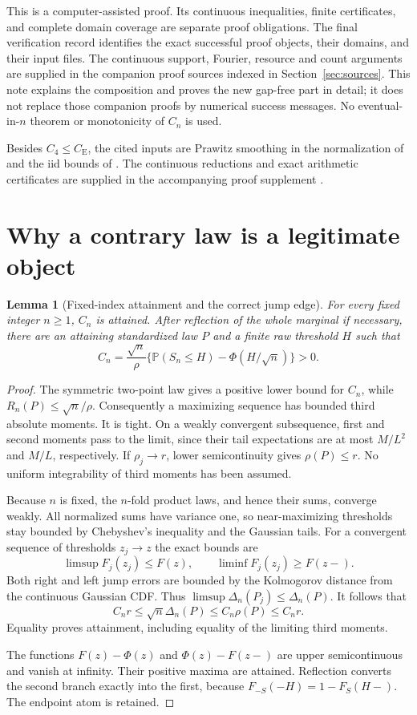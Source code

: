\documentclass[11pt,a4paper]{article}
\newtheorem{lemma}[theorem]{Lemma}
\theoremstyle{definition}
\newcommand{\Pp}{\mathbb P}
\newcommand{\CE}{C_{\mathrm E}}
\begin{document}
This is a computer-assisted proof. Its continuous inequalities, finite
certificates, and complete domain coverage are separate proof obligations.
The final verification record identifies the exact successful
proof objects, their domains, and their input files. The continuous
support, Fourier, resource and count arguments are supplied in the companion
proof sources indexed in Section~\ref{sec:sources}. This note explains the
composition and proves the new gap-free part in detail; it does not replace
those companion proofs by numerical success messages. No eventual-in-$n$ theorem or monotonicity of $C_n$ is used.

Besides $C_4\le\CE$, the cited inputs are Prawitz smoothing in the
normalization of \cite[Lemma~4.1, p.~262]{S2012} and the iid bounds of
\cite[p.~125]{S2013}. The continuous reductions and exact arithmetic certificates are supplied
in the accompanying proof supplement \cite{C5ProofSupplement}.

\section{Why a contrary law is a legitimate object}
\begin{lemma}[Fixed-index attainment and the correct jump edge]\label{lem:attain}
For every fixed integer $n\ge1$, $C_n$ is attained. After reflection of the
whole marginal if necessary, there are an attaining standardized law $P$
and a finite raw threshold $H$ such that
\[
 C_n=\frac{\sqrt n}{\rho}\{\Pp(S_n\le H)-\Phi(H/\sqrt n)\}>0.
\]
\end{lemma}
\begin{proof}
The symmetric two-point law gives a positive lower bound for $C_n$, while
$R_n(P)\le\sqrt n/\rho$. Consequently a maximizing sequence has bounded
third absolute moments. It is tight. On a weakly convergent subsequence,
first and second moments pass to the limit, since their tail expectations
are at most $M/L^2$ and $M/L$, respectively. If $\rho_j\to r$, lower
semicontinuity gives $\rho(P)\le r$. No uniform integrability of third
moments has been assumed.

Because $n$ is fixed, the $n$-fold product laws, and hence their sums,
converge weakly. All normalized sums have variance one, so near-maximizing
thresholds stay bounded by Chebyshev's inequality and the Gaussian tails.
For a convergent sequence of thresholds $z_j\to z$ the exact bounds are
\[
 \limsup F_j(z_j)\le F(z),\qquad
 \liminf F_j(z_j)\ge F(z-).
\]
Both right and left jump errors are bounded by the Kolmogorov distance from
the continuous Gaussian CDF. Thus
$\limsup\Delta_n(P_j)\le\Delta_n(P)$. It follows that
\[
 C_n r\le\sqrt n\Delta_n(P)\le C_n\rho(P)\le C_n r.
\]
Equality proves attainment, including equality of the limiting third
moments.

The functions $F(z)-\Phi(z)$ and $\Phi(z)-F(z-)$ are upper
semicontinuous and vanish at infinity. Their positive maxima are attained.
Reflection converts the second branch exactly into the first, because
$F_{-S}(-H)=1-F_S(H-)$. The endpoint atom is retained.
\end{proof}
\end{document}
